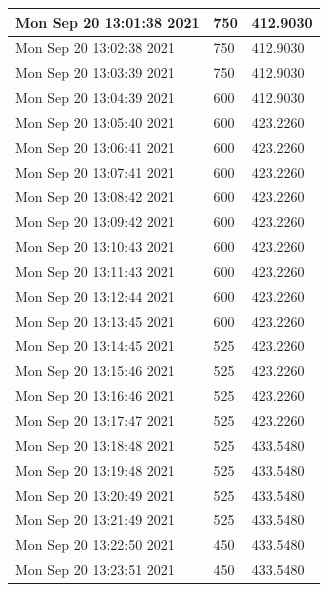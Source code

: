 \begin{longtable}{|l|l|l|}
Mon Sep 20 13:01:38 2021 &                750 &        412.9030 \\ \hline
Mon Sep 20 13:02:38 2021 &                750 &        412.9030 \\ \hline
Mon Sep 20 13:03:39 2021 &                750 &        412.9030 \\ \hline
Mon Sep 20 13:04:39 2021 &                600 &        412.9030 \\ \hline
Mon Sep 20 13:05:40 2021 &                600 &        423.2260 \\ \hline
Mon Sep 20 13:06:41 2021 &                600 &        423.2260 \\ \hline
Mon Sep 20 13:07:41 2021 &                600 &        423.2260 \\ \hline
Mon Sep 20 13:08:42 2021 &                600 &        423.2260 \\ \hline
Mon Sep 20 13:09:42 2021 &                600 &        423.2260 \\ \hline
Mon Sep 20 13:10:43 2021 &                600 &        423.2260 \\ \hline
Mon Sep 20 13:11:43 2021 &                600 &        423.2260 \\ \hline
Mon Sep 20 13:12:44 2021 &                600 &        423.2260 \\ \hline
Mon Sep 20 13:13:45 2021 &                600 &        423.2260 \\ \hline
Mon Sep 20 13:14:45 2021 &                525 &        423.2260 \\ \hline
Mon Sep 20 13:15:46 2021 &                525 &        423.2260 \\ \hline
Mon Sep 20 13:16:46 2021 &                525 &        423.2260 \\ \hline
Mon Sep 20 13:17:47 2021 &                525 &        423.2260 \\ \hline
Mon Sep 20 13:18:48 2021 &                525 &        433.5480 \\ \hline
Mon Sep 20 13:19:48 2021 &                525 &        433.5480 \\ \hline
Mon Sep 20 13:20:49 2021 &                525 &        433.5480 \\ \hline
Mon Sep 20 13:21:49 2021 &                525 &        433.5480 \\ \hline
Mon Sep 20 13:22:50 2021 &                450 &        433.5480 \\ \hline
Mon Sep 20 13:23:51 2021 &                450 &        433.5480 \\ \hline

\end{longtable}
